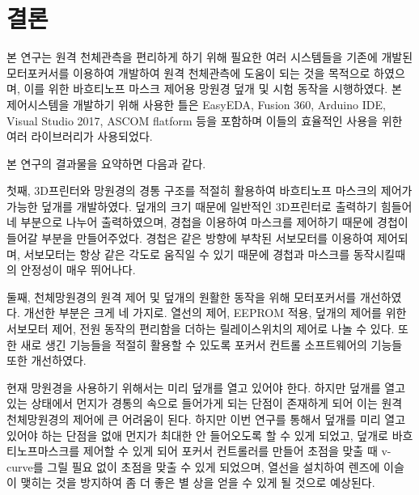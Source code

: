 \newpage

\section{결론}
  본 연구는 원격 천체관측을 편리하게 하기 위해 필요한 여러 시스템들을 기존에 개발된 모터포커서를 이용하여 개발하여 원격 천체관측에 도움이 되는 것을 목적으로 하였으며, 이를 위한 바흐티노프 마스크 제어용 망원경 덮개 및 시험 동작을 시행하였다. 본 제어시스템을 개발하기 위해 사용한 틀은 EasyEDA, Fusion 360, Arduino IDE, Visual Studio 2017, ASCOM flatform 등을 포함하며 이들의 효율적인 사용을 위한 여러 라이브러리가 사용되었다.

본 연구의 결과물을 요약하면 다음과 같다.


첫째, 3D프린터와 망원경의 경통 구조를 적절히 활용하여 바흐티노프 마스크의 제어가 가능한 덮개를 개발하였다. 덮개의 크기 때문에 일반적인 3D프린터로 출력하기 힘들어 네 부분으로 나누어 출력하였으며, 경첩을 이용하여 마스크를 제어하기 때문에 경첩이 들어갈 부분을 만들어주었다. 경첩은 같은 방향에 부착된 서보모터를 이용하여 제어되며, 서보모터는 항상 같은 각도로 움직일 수 있기 때문에 경첩과 마스크를 동작시킬때의 안정성이 매우 뛰어나다.

둘째, 천체망원경의 원격 제어 및 덮개의 원활한 동작을 위해 모터포커서를 개선하였다. 개선한 부분은 크게 네 가지로. 열선의 제어, EEPROM 적용, 덮개의 제어를 위한 서보모터 제어, 전원 동작의 편리함을 더하는 릴레이스위치의 제어로 나놀 수 있다. 또한 새로 생긴 기능들을 적절히 활용할 수 있도록 포커서 컨트롤 소프트웨어의 기능들 또한 개선하였다.

현재 망원경을 사용하기 위해서는 미리 덮개를 열고 있어야 한다. 하지만 덮개를 열고 있는 상태에서 먼지가 경통의 속으로 들어가게 되는 단점이 존재하게 되어 이는 원격 천체망원경의 제어에 큰 어려움이 된다. 하지만 이번 연구를 통해서 덮개를 미리 열고 있어야 하는 단점을 없애 먼지가 최대한 안 들어오도록 할 수 있게 되었고, 덮개로 바흐티노프마스크를 제어할 수 있게 되어 포커서 컨트롤러를 만들어 초점을 맞출 때 v-curve를 그릴 필요 없이 초점을 맞출 수 있게 되었으며, 열선을 설치하여 렌즈에 이슬이 맺히는 것을 방지하여 좀 더 좋은 별 상을 얻을 수 있게 될 것으로 예상된다.